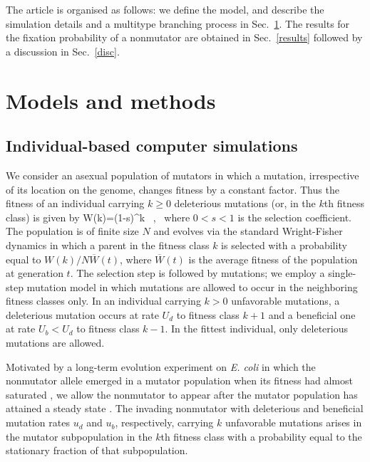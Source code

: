 \documentclass[preprint,12pt,number]{elsarticle}
\begin{document}
The article is organised as follows: we define the model, and describe the simulation details and a multitype branching process in Sec.~\ref{mm}.  The results for the fixation probability of a nonmutator are obtained in Sec.~\ref{results}  followed by a discussion in Sec.~\ref{disc}. 

\section{Models and methods}
\label{mm}

\subsection{Individual-based computer simulations}
\label{sto_sim}

We consider an asexual population of mutators in which a mutation, irrespective of its location on the genome, changes fitness by a constant factor. Thus the fitness of an individual carrying $k \geq 0$ deleterious mutations (or, in the $k$th fitness class) is given by 
\be 
\label{fitfunction}
W(k)=(1-s)^{k} ~,~
\ee 
where $0 < s < 1$ is the selection coefficient.  The population is of finite size $N$ and evolves via the standard Wright-Fisher dynamics \citep{Ewens:1979} in which a parent in the fitness class $k$ is selected with a probability equal to $W(k)/N {\overline W(t)}$, where ${\overline W(t)}$ is the average fitness of the population at generation $t$. The selection step is followed by mutations; we employ a single-step mutation model in which mutations are allowed to occur in the neighboring fitness classes only. In an individual carrying $k > 0$ unfavorable mutations, a deleterious mutation occurs at rate $U_d$ to fitness class $k+1$  and a beneficial one at rate $U_b < U_d$ to fitness class $k-1$. In the fittest individual, only deleterious mutations are allowed. 

 Motivated by a long-term evolution experiment on {\it E. coli} in which the nonmutator allele 
emerged in a mutator population when its fitness had almost saturated \citep{Sniegowski:1997,Wielgoss:2013}, we allow the nonmutator to appear after the mutator population has attained a steady state  \citep{James:2016,James:2016b}. 
The invading nonmutator with deleterious and beneficial mutation rates $u_d$ and $u_b$, respectively, carrying $k$ unfavorable mutations arises in the mutator subpopulation in the $k$th fitness class with a probability equal to the stationary fraction of that subpopulation.
 
\end{document}

